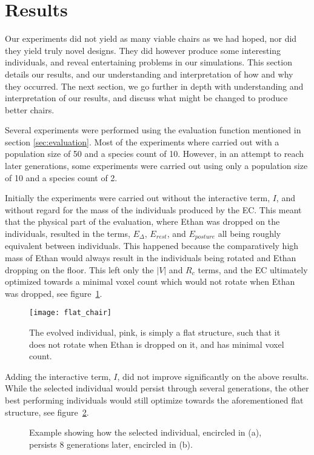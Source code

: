 \section{Results}
\label{sec:results}
Our experiments did not yield as many viable chairs as we had hoped, nor did
they yield truly novel designs. They did however produce some interesting
individuals, and reveal entertaining problems in our simulations.
This section details our results, and our understanding and interpretation of
how and why they occurred. The next section, we go further in depth with
understanding and interpretation of our results, and discuss what might be
changed to produce better chairs.

Several experiments were performed using the evaluation
function mentioned in section \ref{sec:evaluation}. Most of the experiments 
where carried out with a population size of 50 and a species count of 10. 
However, in an attempt to reach later generations, some experiments were 
carried out using only a population size of 10 and a species count of 2.

Initially the experiments were carried out without the interactive term, $I$,
and without regard for the mass of the individuals produced by the EC. This
meant that the physical part of the evaluation, where Ethan was dropped on the
individuals, resulted in the terms, $E_\Delta$, $E_{rest}$, and $E_{posture}$
all being roughly equivalent between individuals. This happened because the
comparatively high mass of Ethan would always result in the individuals being
rotated and Ethan dropping on the floor. This left only the $|V|$ and $R_c$
terms, and the EC ultimately optimized towards a minimal voxel count which would
not rotate when Ethan was dropped, see figure~\ref{fig:flat_object}.

\begin{figure}[ht]
\centering
\texttt{[image: flat\_chair]}
\caption{The evolved individual, pink, is simply a flat structure, such that
it does not rotate when Ethan is dropped on it, and has minimal voxel
count.} \label{fig:flat_object} 
\end{figure}

Adding the interactive term, $I$, did not improve significantly on the above
results. While the selected individual would persist through several
generations, the other best performing individuals would still optimize towards
the aforementioned flat structure, see figure~\ref{fig:selection}.
\begin{figure}[ht]
	\centering
	 \hfil
	\caption{Example showing how the selected individual, encircled in (a),
	persists 8 generations later, encircled in (b).} \label{fig:selection}
\end{figure}

